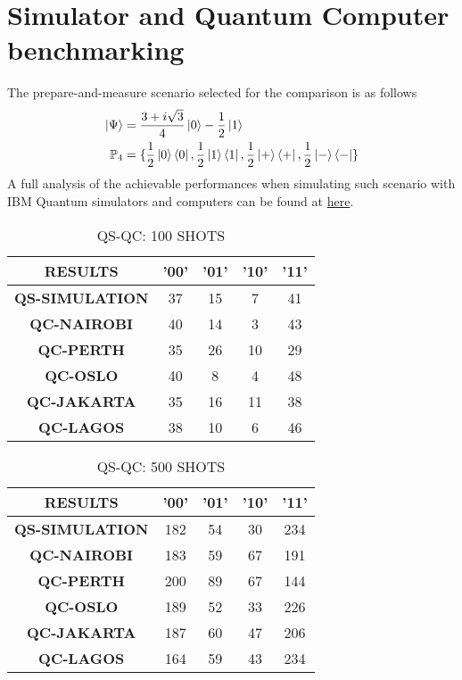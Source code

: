 \section{Simulator and Quantum Computer benchmarking}\label{section:benchmark}
The prepare-and-measure scenario selected for the comparison is as follows
\begin{equation}
\begin{split}
\ket{\Psi}&=\frac{3 + i \sqrt{3}}{4} \ket{0} - \frac{1}{2} \ket{1}\\
\mathbb{P}_4&=\{\frac{1}{2}\ket{0}\bra{0}, \frac{1}{2}\ket{1}\bra{1}, \frac{1}{2}\ket{+}\bra{+}, \frac{1}{2}\ket{-}\bra{-} \}
\end{split}
\end{equation}
A full analysis of the achievable performances when simulating such scenario with IBM Quantum simulators and computers can be found at \href{https://github.com/inaki-ortizdelandaluce/qubit-communication-simulations/blob/main/tex/xls/qc_probabilities_summary.xlsx}{here}.

\begin{table}[!ht]
    \centering
    \begin{tabular}{ccccc}
    \hline
        \textbf{RESULTS} & \textbf{'00'} & \textbf{'01'} & \textbf{'10'} & \textbf{'11' } \\ \hline
        \textbf{QS-SIMULATION} & 37 & 15 & 7 & 41  \\ 
        \textbf{QC-NAIROBI} & 40 & 14 & 3 & 43  \\ 
        \textbf{QC-PERTH} & 35 & 26 & 10 & 29  \\ 
        \textbf{QC-OSLO} & 40 & 8 & 4 & 48  \\ 
        \textbf{QC-JAKARTA} & 35 & 16 & 11 & 38  \\ 
        \textbf{QC-LAGOS} & 38 & 10 & 6 & 46 \\ \hline
    \end{tabular}
    \caption{QS-QC: 100 SHOTS}
\end{table}

\begin{table}[!ht]
    \centering
    \begin{tabular}{ccccc}
    \hline
        \textbf{RESULTS} & \textbf{'00'} & \textbf{'01'} & \textbf{'10'} & \textbf{'11' } \\ \hline
        \textbf{QS-SIMULATION} & 182 & 54 & 30 & 234  \\ 
        \textbf{QC-NAIROBI} & 183 & 59 & 67 & 191  \\ 
        \textbf{QC-PERTH} & 200 & 89 & 67 & 144  \\ 
        \textbf{QC-OSLO} & 189 & 52 & 33 & 226  \\ 
        \textbf{QC-JAKARTA} & 187 & 60 & 47 & 206  \\ 
        \textbf{QC-LAGOS} & 164 & 59 & 43 & 234 \\ \hline
    \end{tabular}
    \caption{QS-QC: 500 SHOTS}
\end{table}

